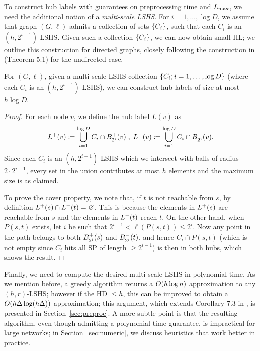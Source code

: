 To construct hub labels with guarantees on preprocessing time and $\Lm$, we need the additional notion of a \emph{multi-scale LSHS}. 
For $i=1,\ldots,\log D$, we assume that graph $(G,\ell)$ admits a collection of sets $\crl*{C_i}$, such that each $C_i$ is an $(h,2^{i-1})$-LSHS.
Given such a collection $\crl*{C_i}$, we can now obtain small HL; we outline this construction for directed graphs, closely following the construction in \cite{highway2013} (Theorem 5.1) for the undirected case.
\begin{proposition}
\label{theo:construct_hl}
For $(G,\ell)$, given a multi-scale LSHS collection $\crl*{C_i;i=1,\ldots,\log D}$ (where each $C_i$ is an $(h,2^{i-1})$-LSHS), we can construct hub labels of size at most $h\log D$.
\end{proposition}
\begin{proof}
For each node $v$, we define the hub label $L(v)$ as
\begin{align*}
\Lf(v)\defeq  \bigcup_{i=1}^{\log D}C_i\cap \Bf_{2^i}(v)\;,\;
\Lb(v)\defeq \bigcup_{i=1}^{\log D}C_i\cap \Bb_{2^i}(v).
\end{align*}
Since each $C_i$ is an $(h,2^{i-1})$-LSHS which we intersect with balls of radius $2\cdot 2^{i-1}$, every set in the union contributes at most $h$ elements and the maximum size is as claimed.

To prove the cover property, we note that, if $t$ is not reachable from $s$, by definition $\Lf(s)\cap\Lb(t)=\varnothing$.
This is because the elements in $\Lf(s)$ are reachable from $s$ and the elements in $\Lb(t)$ reach $t$.
On the other hand, when $P(s,t)$ exists, let $i$ be such that $2^{i-1}<\ell(P(s,t))\leq 2^i$.
Now any point in the path belongs to both $\Bf_{2^i}(s)$ and $\Bb_{2^i}(t)$, and hence $C_i\cap P(s,t)$  (which is not empty since $C_i$ hits all SP of length $\geq 2^{i-1}$) is then in both hubs, which shows the result.
\end{proof}


Finally, we need to compute the desired multi-scale LSHS in polynomial time.
As we mention before, a greedy algorithm returns a $\Or(h\log n)$ approximation to any $(h,r)$-LSHS; however if the HD $\leq h$, this can be improved to obtain a $\Or(h\Delta\log(h\Delta))$ approximation; this argument, which extends Corollary 7.3 in \cite{highway2013}, is presented in Section~\ref{sec:preproc}.
A more subtle point is that the resulting algorithm, even though admitting a polynomial time guarantee, is impractical for large networks; in Section~\ref{sec:numeric}, we discuss heuristics that work better in practice.